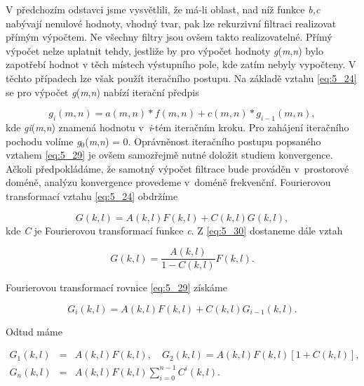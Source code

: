 \noindent V předchozím odstavci jsme vysvětlili, že má-li oblast, nad níž funkce \textit{b,c} nabývají nenulové hodnoty, vhodný tvar, pak lze rekurzivní filtraci realizovat přímým výpočtem. Ne všechny filtry jsou ovšem takto realizovatelné. Přímý výpočet nelze uplatnit tehdy, jestliže by pro výpočet hodnoty \textit{g}(\textit{m},\textit{n}) bylo zapotřebí hodnot v těch místech výstupního pole, kde zatím nebyly vypočteny. V těchto případech lze však použít iteračního postupu. Na základě vztahu \eqref{eq:5_24} se pro výpočet \textit{g}(\textit{m},\textit{n}) nabízí iterační předpis

\begin{equation} \label{eq:5_29}
    g_i(m, n) = a(m, n) * f(m, n) + c(m, n) * g_{i-1} (m, n),
\end{equation}
kde \textit{gi}(\textit{m},\textit{n}) znamená hodnotu v~\textit{i}-tém iteračním kroku. Pro zahájení iteračního pochodu volíme \textit{g}$_0$(\textit{m},\textit{n}) = 0. Oprávněnost iteračního postupu popsaného vztahem \eqref{eq:5_29} je ovšem samozřejmě nutné doložit studiem konvergence. Ačkoli předpokládáme, že samotný výpočet filtrace bude prováděn v~prostorové doméně, analýzu konvergence provedeme v~doméně frekvenční. Fourierovou transformací vztahu \eqref{eq:5_24} obdržíme

\begin{equation} \label{eq:5_30}
    G(k, l) = A(k, l) F(k, l) + C(k, l) G(k, l),
\end{equation}
kde \textit{C} je Fourierovou transformací funkce \textit{c}. Z \eqref{eq:5_30} dostaneme dále vztah

\begin{equation} \label{eq:5_31}
    G(k, l) = \frac{A(k, l)}{1 - C(k, l)} F(k, l).
\end{equation}

Fourierovou transformací rovnice \eqref{eq:5_29} získáme

\begin{equation} \label{eq:5_32}
    G_i(k, l) = A(k, l) F(k, l) + C(k, l) G_{i-1}(k, l).
\end{equation}

Odtud máme

\begin{eqnarray} \label{eq:5_33}
    G_1(k, l) &=& A(k, l) F(k, l), \quad G_2(k, l) = A(k, l) F(k, l) \left[ 1 + C(k, l) \right],\\
    G_n(k, l) &=& A(k, l) F(k, l) \sum\limits_{i=0}^{n-1} C^i(k, l). \nonumber
\end{eqnarray}

